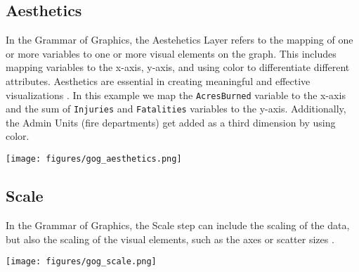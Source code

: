 \vspace{-3mm}

\subsection*{Aesthetics}
\vspace{-2mm}
\begin{minipage}[t]{0.6\textwidth}
    In the Grammar of Graphics, the Aestehetics Layer refers to the mapping of one or more variables to one or more visual elements on the graph. This includes 
    mapping variables to the x-axis, y-axis, and using color to differentiate different attributes. Aesthetics are essential in creating meaningful and 
    effective visualizations \cite{wilkinsonAesthetics2005}.
    In this example we map the \texttt{AcresBurned} variable to the x-axis and the sum of \texttt{Injuries} and \texttt{Fatalities} variables to the y-axis. Additionally,
    the Admin Units (fire departments) get added as a third dimension by using color.
    \hspace{1cm}
\end{minipage}
\begin{minipage}[t]{0.4\textwidth}
    \vspace{-20pt}
    \texttt{[image: figures/gog\_aesthetics.png]}
\end{minipage}

\vspace{-3mm}

\subsection*{Scale}
\vspace{-2mm}
\begin{minipage}[t]{0.6\textwidth}
    In the Grammar of Graphics, the Scale step can include the scaling of the data, but 
    also the scaling of the visual elements, such as the axes or scatter sizes \cite{wilkinsonScales2005}.
    \hspace{1cm}
\end{minipage}%
\begin{minipage}[t]{0.4\textwidth}
    \vspace{-20pt}
    \texttt{[image: figures/gog\_scale.png]}
\end{minipage}

\vspace{-2mm}

